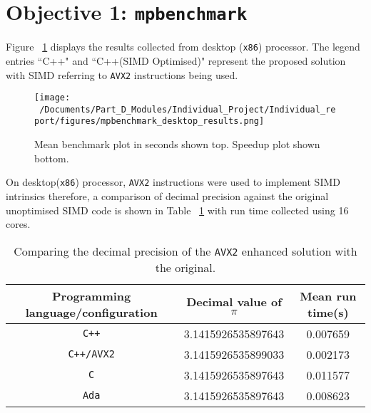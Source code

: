 \section{Objective 1: \texttt{mpbenchmark}}

Figure ~\ref{fig:mpbenchmark_desktop_plot} displays the results collected from desktop (\texttt{x86}) processor. The legend entries ``C++" and ``C++(SIMD Optimised)" represent the proposed solution with SIMD referring to \texttt{AVX2} instructions being used. 

\begin{figure}[htbp] %
	\centering
	\texttt{[image: ~/Documents/Part\_D\_Modules/Individual\_Project/Individual\_report/figures/mpbenchmark\_desktop\_results.png]} %
	\caption{Mean benchmark plot in seconds shown top. Speedup plot shown bottom.}
	\label{fig:mpbenchmark_desktop_plot} %
\end{figure}


On desktop(\texttt{x86}) processor, \texttt{AVX2} instructions were used to implement SIMD intrinsics therefore, a comparison of decimal precision against the original unoptimised SIMD code is shown in Table ~\ref{tab:c++_avx2_pi} with run time collected using 16 cores. 

\begin{table}[htbp]
	\centering
	\begin{tabular}{ccc}
		\hline
		\textbf{Programming language/configuration} & \textbf{Decimal value of $\pi$} & \textbf{Mean run time(s)} \\ \hline
		\texttt{C++}             & 3.1415926535897643 &  0.007659 \\ \hline
		\texttt{C++/AVX2}   & 3.1415926535899033 &  0.002173  \\ \hline
		\texttt{C}                 & 3.1415926535897643 & 0.011577 \\ \hline
		\texttt{Ada}             & 3.1415926535897643 &  0.008623\\ \hline
	\end{tabular}
	\label{tab:c++_avx2_pi}
	\caption{Comparing the decimal precision of the \texttt{AVX2} enhanced solution with the original.}
\end{table}


